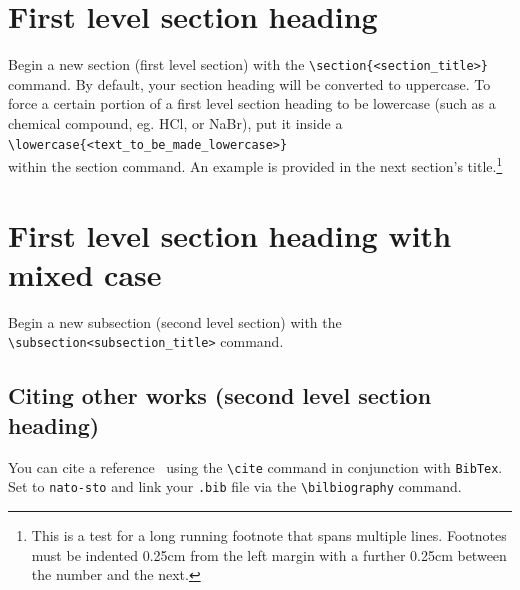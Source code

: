 \documentclass{nato-sto}
\begin{document}
\section{First level section heading}	\label{sec:ref_sec1}

Begin a new section (first level section) with the \verb|\section{<section_title>}| command. By default, your section heading will be converted to uppercase. To force a certain portion of a first level section heading to be lowercase (such as a chemical compound, eg. HCl, or NaBr), put it inside a\\
\verb|\lowercase{<text_to_be_made_lowercase>}| \\
within the section command. An example is provided in the next section's title.\footnote{This is a test for a long running footnote that spans multiple lines. Footnotes must be indented 0.25cm from the left margin with a further 0.25cm between the number and the next.}

\clearpage

\section{First level section heading with mixed \lowercase{case}}

Begin a new subsection (second level section) with the \verb|\subsection<subsection_title>| command.

\subsection{Citing other works (second level section heading)}

You can cite a reference~\cite{Wu2009} using the \verb|\cite| command in conjunction with \verb|BibTex|. Set \verb|| to \verb|nato-sto| and link your \verb|.bib| file via the \verb|\bilbiography| command.

\end{document}
